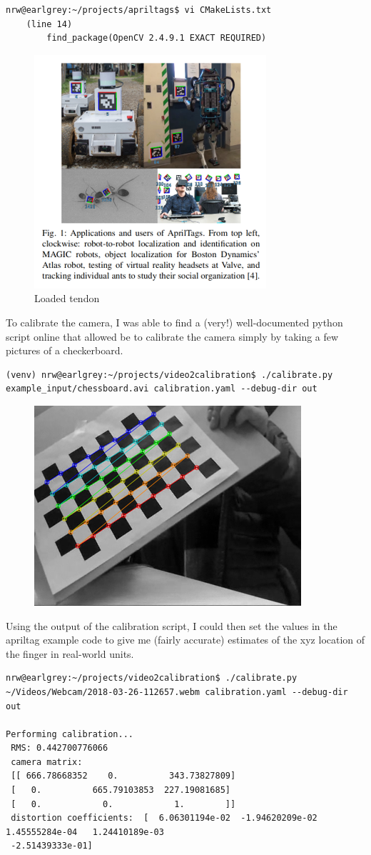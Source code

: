 \documentclass[12pt]{article}
\begin{document}
\begin{lstlisting}
nrw@earlgrey:~/projects/apriltags$ vi CMakeLists.txt 
    (line 14)
        find_package(OpenCV 2.4.9.1 EXACT REQUIRED)
\end{lstlisting}

\begin{figure}[H]
\centering
\includegraphics[width=.4\textwidth]{images/april/applications_april.png}
\caption{Loaded tendon}
\end{figure}

To calibrate the camera, I was able to find a (very!) well-documented python script online that allowed be to calibrate the camera simply by taking a few pictures of a checkerboard.

\begin{lstlisting}
(venv) nrw@earlgrey:~/projects/video2calibration$ ./calibrate.py example_input/chessboard.avi calibration.yaml --debug-dir out
\end{lstlisting}

\begin{figure}[H]
\centering
\includegraphics[width=.4\textwidth]{images/april/webcam_calibration.png}
\end{figure}

Using the output of the calibration script, I could then set the values in the apriltag example code
to give me (fairly accurate) estimates of the xyz location of the finger in real-world units.

\begin{lstlisting}
nrw@earlgrey:~/projects/video2calibration$ ./calibrate.py ~/Videos/Webcam/2018-03-26-112657.webm calibration.yaml --debug-dir out

Performing calibration...
 RMS: 0.442700776066
 camera matrix:
 [[ 666.78668352    0.          343.73827809]
 [   0.          665.79103853  227.19081685]
 [   0.            0.            1.        ]]
 distortion coefficients:  [  6.06301194e-02  -1.94620209e-02   1.45555284e-04   1.24410189e-03
 -2.51439333e-01]
\end{lstlisting}
\end{document}
